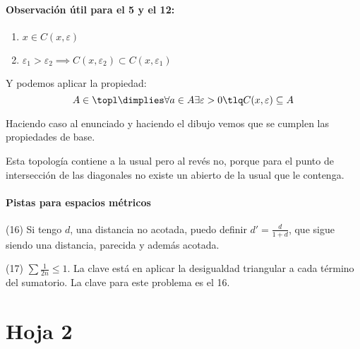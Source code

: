 \paragraph{Observación útil para el 5 y el 12:}  
\begin{enumerate}
\item $x \in C(x,\varepsilon)$
\item $\varepsilon_1 > \varepsilon_2 \implies C(x,\varepsilon_2) \subset C(x,\varepsilon_1)$
\end{enumerate}

Y podemos aplicar la propiedad:
\[
A\in\topl \dimplies \forall a\in A \exists \varepsilon > 0 \tlq C(x,\varepsilon)\subseteq A
\]

Haciendo caso al enunciado y haciendo el dibujo vemos que se cumplen las propiedades de base.

Esta topología contiene a la usual pero al revés no, porque para el punto de intersección de las diagonales no existe un abierto de la usual que le contenga.


\paragraph{Pistas para espacios métricos}

(16) Si tengo $d$, una distancia no acotada, puedo definir $d'=\frac{d}{1+d}$, que sigue siendo una distancia, parecida y además acotada.

(17) $\sum \frac{1}{2n} \leq 1$. La clave está en aplicar la desigualdad triangular a cada término del sumatorio. La clave para este problema es el 16.

\section{Hoja 2}

